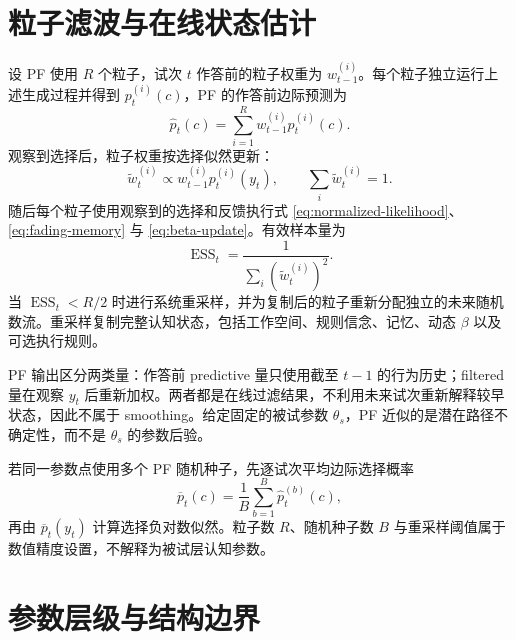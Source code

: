 \documentclass[12pt]{article}
\begin{document}
\section{粒子滤波与在线状态估计}

设 PF 使用 $R$ 个粒子，试次 $t$ 作答前的粒子权重为 $w_{t-1}^{(i)}$。每个粒子独立运行上述生成过程并得到
$p_t^{(i)}(c)$，PF 的作答前边际预测为
\begin{equation}
\widehat p_t(c)
=\sum_{i=1}^{R}w_{t-1}^{(i)}p_t^{(i)}(c).
\label{eq:pf-predictive}
\end{equation}
观察到选择后，粒子权重按选择似然更新：
\begin{equation}
\widetilde w_t^{(i)}
\propto
w_{t-1}^{(i)}p_t^{(i)}(y_t),
\qquad
\sum_i\widetilde w_t^{(i)}=1.
\label{eq:pf-weight-update}
\end{equation}
随后每个粒子使用观察到的选择和反馈执行式 \eqref{eq:normalized-likelihood}、\eqref{eq:fading-memory} 与 \eqref{eq:beta-update}。有效样本量为
\begin{equation}
\operatorname{ESS}_t
=\frac{1}{\sum_i(\widetilde w_t^{(i)})^2}.
\label{eq:ess}
\end{equation}
当 $\operatorname{ESS}_t<R/2$ 时进行系统重采样，并为复制后的粒子重新分配独立的未来随机数流。重采样复制完整认知状态，包括工作空间、规则信念、记忆、动态 $\beta$ 以及可选执行规则。

PF 输出区分两类量：作答前 predictive 量只使用截至 $t-1$ 的行为历史；filtered 量在观察 $y_t$ 后重新加权。两者都是在线过滤结果，不利用未来试次重新解释较早状态，因此不属于 smoothing。给定固定的被试参数 $\theta_s$，PF 近似的是潜在路径不确定性，而不是 $\theta_s$ 的参数后验。

若同一参数点使用多个 PF 随机种子，先逐试次平均边际选择概率
\begin{equation}
\overline p_t(c)=\frac{1}{B}\sum_{b=1}^{B}\widehat p_t^{(b)}(c),
\label{eq:seed-aggregation}
\end{equation}
再由 $\overline p_t(y_t)$ 计算选择负对数似然。粒子数 $R$、随机种子数 $B$ 与重采样阈值属于数值精度设置，不解释为被试层认知参数。


\section{参数层级与结构边界}
\end{document}
